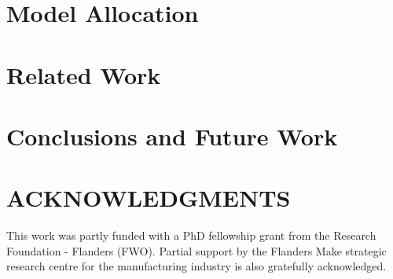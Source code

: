 \documentclass[twocolumn]{sagej}
\begin{document}
\section{Model Allocation}
\label{sec:4a-allocation}


\section{Related Work}
\label{sec:5-related-work}


\section{Conclusions and Future Work}
\label{sec:6-conclusion}


\section*{ACKNOWLEDGMENTS}
This work was partly funded with a PhD fellowship grant from the Research Foundation - Flanders (FWO). 
Partial support by the Flanders Make strategic research centre for the manufacturing industry is also gratefully acknowledged.



\end{document}
